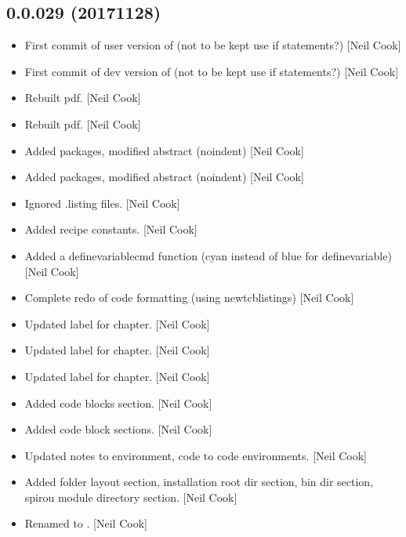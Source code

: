 \documentclass[a4paper,10pt,english]{report}
\begin{document}
\subsection{0.0.029 (2017\sphinxhyphen{}11\sphinxhyphen{}28)}
\label{\detokenize{misc/changelog:id542}}\begin{itemize}
\item {} 
First commit of user version of  (not to be kept \sphinxhyphen{}
use if statements?) {[}Neil Cook{]}

\item {} 
First commit of dev version of  (not to be kept \sphinxhyphen{} use
if statements?) {[}Neil Cook{]}

\item {} 
Rebuilt pdf. {[}Neil Cook{]}

\item {} 
Rebuilt pdf. {[}Neil Cook{]}

\item {} 
Added packages, modified abstract (noindent) {[}Neil Cook{]}

\item {} 
Added packages, modified abstract (noindent) {[}Neil Cook{]}

\item {} 
Ignored .listing files. {[}Neil Cook{]}

\item {} 
Added recipe constants. {[}Neil Cook{]}

\item {} 
Added a definevariablecmd function (cyan instead of blue for
definevariable) {[}Neil Cook{]}

\item {} 
Complete redo of code formatting (using newtcblistings) {[}Neil Cook{]}

\item {} 
Updated label for chapter. {[}Neil Cook{]}

\item {} 
Updated label for chapter. {[}Neil Cook{]}

\item {} 
Updated label for chapter. {[}Neil Cook{]}

\item {} 
Added code blocks section. {[}Neil Cook{]}

\item {} 
Added code block sections. {[}Neil Cook{]}

\item {} 
Updated notes to environment, code to code environments. {[}Neil Cook{]}

\item {} 
Added folder layout section, installation root dir section, bin dir
section, spirou module directory section. {[}Neil Cook{]}

\item {} 
Renamed  to . {[}Neil Cook{]}

\end{itemize}
\end{document}
